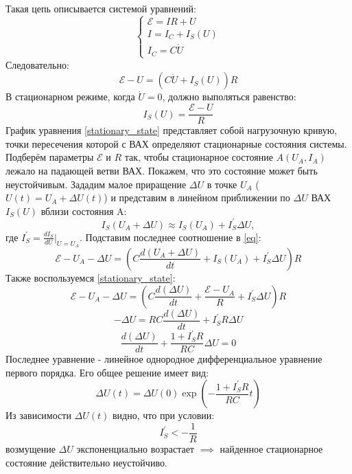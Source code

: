 \documentclass[14pt, a4paper,reqno]{article}
\begin{document}
    Такая цепь описывается системой уравнений:
    \begin{equation*}
        \begin{cases}
            \mathcal{E} = IR + U \\
            I = I_C + I_S(U) \\
            I_C = C\dot{U}
        \end{cases}
    \end{equation*}
    Следовательно:
    \begin{equation}\label{eq}
        \mathcal{E} - U = (C\dot{U} + I_S(U))R
    \end{equation}
    В стационарном режиме, когда $\dot{U} = 0$, должно выполяться равенство:
    \begin{equation}\label{stationary_state}
        I_S(U) = \frac{\mathcal{E} - U}{R}
    \end{equation}
    График уравнения \eqref{stationary_state} представляет собой нагрузочную кривую, точки пересечения
    которой с ВАХ определяют стационарные состояния системы. Подберём параметры $\mathcal{E}$ и $R$ так,
    чтобы стационарное состояние $A(U_A, I_A)$ лежало на падающей ветви ВАХ. Покажем, что это состояние
    может быть неустойчивым. Зададим малое приращение $\Delta U$ в точке $U_A$ ($U(t) = U_A + \Delta U(t)$) и 
    представим в линейном приближении по $\Delta U$ ВАХ $I_S(U)$ вблизи состояния A:
    \begin{equation*}
        I_S(U_A + \Delta U) \approx I_S(U_A) + I_S^{'}\Delta U,
    \end{equation*}
    где $I_S^{'} = \frac{dI_S}{dU}\bigg|_{U = U_A}$. Подставим последнее соотношение в \eqref{eq}:
    \begin{equation*}
        \mathcal{E} - U_A - \Delta U = \left(C\frac{d(U_A + \Delta U)}{dt} + I_S(U_A) + I_S^{'}\Delta U\right)R
    \end{equation*}
    Также воспользуемся \eqref{stationary_state}:
    \begin{equation*}
        \mathcal{E} - U_A - \Delta U = \left(C\frac{d(\Delta U)}{dt} + \frac{\mathcal{E} - U_A}{R} + I_S^{'}\Delta U\right)R
    \end{equation*}
    \begin{equation*}
        -\Delta U = RC\frac{d(\Delta U)}{dt} + I_S^{'}R\Delta U
    \end{equation*}
    \begin{equation*}
        \frac{d(\Delta U)}{dt} + \frac{1 + I_S^{'}R}{RC}\Delta U = 0
    \end{equation*}
    Последнее уравнение - линейное однородное дифференциальное уравнение первого порядка. Его общее 
    решение имеет вид:
    \begin{equation*}
        \Delta U(t) = \Delta U(0) \exp\left(-\frac{1 + I_S^{'}R}{RC}t\right)
    \end{equation*}
    Из зависимости $\Delta U(t)$ видно, что при условии:
    \begin{equation}\label{condition}
        I_S^{'} < -\frac{1}{R}
    \end{equation}
    возмущение $\Delta U$ экспоненциально возрастает $\implies$ найденное стационарное состояние 
    действительно неустойчиво.
\end{document}
